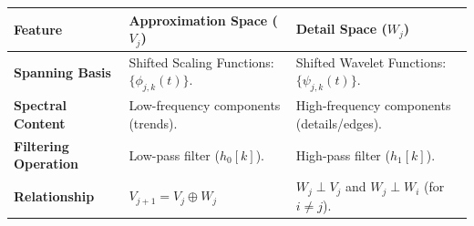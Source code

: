 \documentclass[12pt,a4paper]{article}
\renewcommand{\arraystretch}{1.45}
\begin{document}
\begin{tcolorbox}[tikzbox, title={\textbf{Comparison Table: Approximation vs. Detail Spaces}}]
\par\noindent
{\renewcommand{\arraystretch}{1.4}%
\begin{tabularx}{\linewidth}{|B{3.2cm}|Y|Y|}
\hline
\textbf{Feature} & \textbf{Approximation Space ($V_j$)} & \textbf{Detail Space ($W_j$)} \\
\hline
\textbf{Spanning Basis} & Shifted Scaling Functions: $\{\phi_{j,k}(t)\}$. & Shifted Wavelet Functions: $\{\psi_{j,k}(t)\}$. \\
\hline
\textbf{Spectral Content} & Low-frequency components (trends). & High-frequency components (details/edges). \\
\hline
\textbf{Filtering Operation} & Low-pass filter ($h_0[k]$). & High-pass filter ($h_1[k]$). \\
\hline
\textbf{Relationship} & $V_{j+1} = V_j \oplus W_j$ & $W_j \perp V_j$ and $W_j \perp W_i$ (for $i \neq j$). \\
\hline
\end{tabularx}}
\end{tcolorbox}
\end{document}
